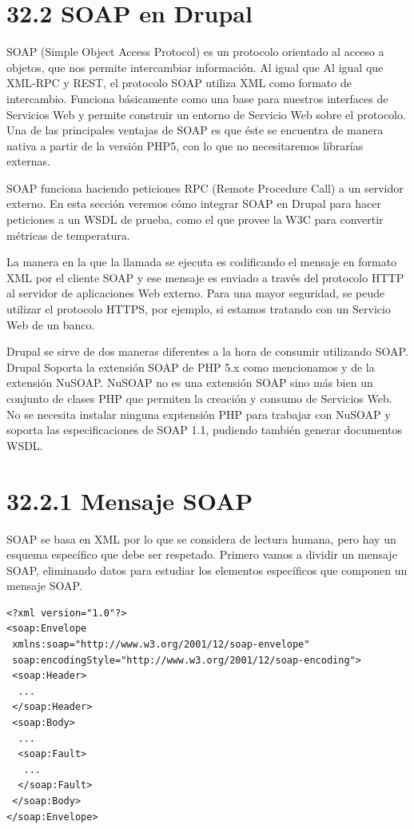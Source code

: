 \section{\Huge{32.2 SOAP en Drupal}}

SOAP (Simple Object Access Protocol) es un protocolo orientado al acceso a objetos, que nos permite intercambiar 
información. Al igual que Al igual que XML-RPC y REST, el protocolo SOAP utiliza XML como formato de 
intercambio. Funciona básicamente como una base para nuestros interfaces de Servicios Web y permite construir 
un entorno de Servicio Web sobre el protocolo. Una de las principales ventajas de SOAP es que éste se encuentra 
de manera nativa a partir de la versión PHP5, con lo que no necesitaremos librarías externas.

SOAP funciona haciendo peticiones RPC (Remote Procedure Call) a un servidor externo. En esta sección veremos 
cómo integrar SOAP en Drupal para hacer peticiones a un WSDL de prueba, como el que provee la W3C para convertir 
métricas de temperatura.

La manera en la que la llamada se ejecuta es codificando el mensaje en formato XML por el cliente SOAP y 
ese mensaje es enviado a través del protocolo HTTP al servidor de aplicaciones Web externo. Para una mayor 
seguridad, se peude utilizar el protocolo HTTPS, por ejemplo, si estamos tratando con un Servicio Web de un banco.
   
Drupal se sirve de dos maneras diferentes a la hora de consumir utilizando SOAP. Drupal Soporta la extensión SOAP  
de PHP 5.x como mencionamos y de la extensión NuSOAP. NuSOAP no es una extensión SOAP sino más bien un conjunto 
de clases PHP que permiten la creación y consumo de Servicios Web. No se necesita instalar ninguna exptensión PHP 
para trabajar con NuSOAP y soporta las especificaciones de SOAP 1.1, pudiendo también generar documentos WSDL.

\section{\Large{32.2.1 Mensaje SOAP}}

SOAP se basa en XML por lo que se considera de lectura humana, pero hay un esquema específico que debe 
ser respetado. Primero vamos a dividir un mensaje SOAP, eliminando datos para estudiar los elementos 
específicos que componen un mensaje SOAP.

\begin{verbatim}
<?xml version="1.0"?>
<soap:Envelope
 xmlns:soap="http://www.w3.org/2001/12/soap-envelope"
 soap:encodingStyle="http://www.w3.org/2001/12/soap-encoding">
 <soap:Header>
  ...
 </soap:Header>
 <soap:Body>
  ...
  <soap:Fault>
   ...
  </soap:Fault>
 </soap:Body>
</soap:Envelope>
\end{verbatim}

